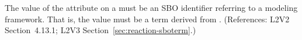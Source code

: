 The value of the  attribute on a \Reaction must be an SBO
identifier referring to a modeling framework.  That is, the value must
be a term derived from \sboevent.  (References: L2V2 Section~4.13.1; L2V3
Section~\ref{sec:reaction-sboterm}.)
